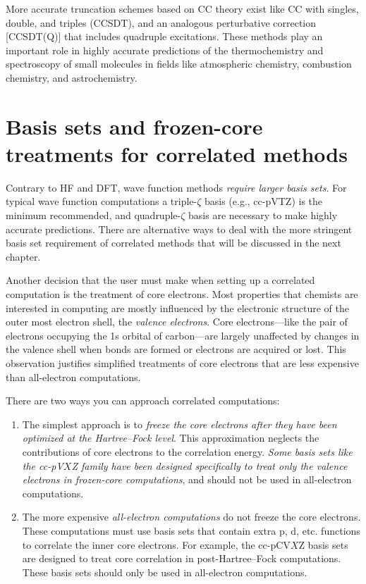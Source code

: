 \documentclass[../Main/chem371-notes.tex]{subfiles}
\begin{document}
More accurate truncation schemes based on CC theory exist like CC with singles, double, and triples (CCSDT), and an analogous perturbative correction [CCSDT(Q)] that includes quadruple excitations.
These methods play an important role in highly accurate predictions of  the thermochemistry and spectroscopy of small molecules in fields like atmospheric chemistry, combustion chemistry, and astrochemistry.

\section{Basis sets and frozen-core treatments for correlated methods}

Contrary to HF and DFT, wave function methods \emph{require larger basis sets}.
For typical wave function computations a triple-$\zeta$ basis (e.g., cc-pVTZ) is the minimum recommended, and quadruple-$\zeta$ basis are necessary to make highly accurate predictions.
There are alternative ways to deal with the more stringent basis set requirement of correlated methods that will be discussed in the next chapter.

Another decision that the user must make when setting up a correlated computation is the treatment of core electrons.
Most properties that chemists are interested in computing are mostly influenced by the electronic structure of the outer most electron shell, the \emph{valence electrons}.
Core electrons---like the pair of electrons occupying the 1s orbital of carbon---are largely unaffected by changes in the valence shell when bonds are formed or electrons are acquired or lost.
This observation justifies simplified treatments of core electrons that are less expensive than all-electron computations.

There are two ways you can approach correlated computations:
\begin{enumerate}
\item The simplest approach is to \emph{freeze the core electrons after they have been optimized at the Hartree--Fock level}.
This approximation neglects the contributions of core electrons to the correlation energy.
\emph{Some basis sets like the cc-pV$X$Z family have been designed specifically to treat only the valence electrons in frozen-core computations}, and should not be used in all-electron computations.

\item The more expensive \emph{all-electron computations} do not freeze the core electrons.
These computations must use basis sets that contain extra p, d, etc. functions to correlate the inner core electrons.
For example, the cc-pCV$X$Z basis sets are designed to treat core correlation in post-Hartree--Fock computations.
These basis sets should only be used in all-electron computations.
\end{enumerate}
\end{document}
